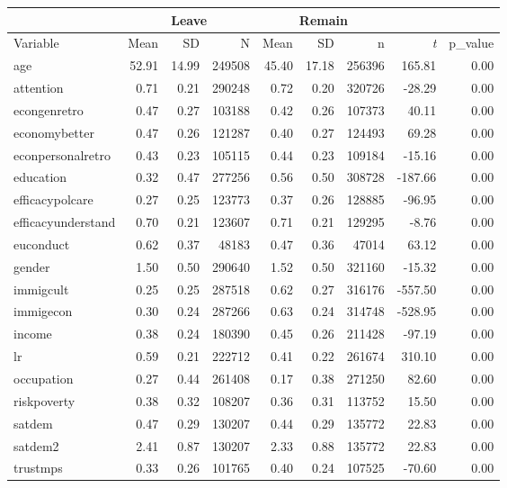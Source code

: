 \documentclass{article}
\begin{document}
 \begin{table}[ht]
\centering
\begin{tabular}{lrrrrrrrr}
& \multicolumn{3}{c}{Leave} & \multicolumn{3}{c}{Remain} & \\
  \hline
Variable & Mean & SD & N & Mean & SD & n & \textit{t} & p\_value \\ 
  \hline
age & 52.91 & 14.99 & 249508 & 45.40 & 17.18 & 256396 & 165.81 & 0.00 \\ 
  attention & 0.71 & 0.21 & 290248 & 0.72 & 0.20 & 320726 & -28.29 & 0.00 \\ 
  econgenretro & 0.47 & 0.27 & 103188 & 0.42 & 0.26 & 107373 & 40.11 & 0.00 \\ 
  economybetter & 0.47 & 0.26 & 121287 & 0.40 & 0.27 & 124493 & 69.28 & 0.00 \\ 
  econpersonalretro & 0.43 & 0.23 & 105115 & 0.44 & 0.23 & 109184 & -15.16 & 0.00 \\ 
  education & 0.32 & 0.47 & 277256 & 0.56 & 0.50 & 308728 & -187.66 & 0.00 \\ 
  efficacypolcare & 0.27 & 0.25 & 123773 & 0.37 & 0.26 & 128885 & -96.95 & 0.00 \\ 
  efficacyunderstand & 0.70 & 0.21 & 123607 & 0.71 & 0.21 & 129295 & -8.76 & 0.00 \\ 
  euconduct & 0.62 & 0.37 & 48183 & 0.47 & 0.36 & 47014 & 63.12 & 0.00 \\ 
  gender & 1.50 & 0.50 & 290640 & 1.52 & 0.50 & 321160 & -15.32 & 0.00 \\ 
  immigcult & 0.25 & 0.25 & 287518 & 0.62 & 0.27 & 316176 & -557.50 & 0.00 \\ 
  immigecon & 0.30 & 0.24 & 287266 & 0.63 & 0.24 & 314748 & -528.95 & 0.00 \\ 
  income & 0.38 & 0.24 & 180390 & 0.45 & 0.26 & 211428 & -97.19 & 0.00 \\ 
  lr & 0.59 & 0.21 & 222712 & 0.41 & 0.22 & 261674 & 310.10 & 0.00 \\ 
  occupation & 0.27 & 0.44 & 261408 & 0.17 & 0.38 & 271250 & 82.60 & 0.00 \\ 
  riskpoverty & 0.38 & 0.32 & 108207 & 0.36 & 0.31 & 113752 & 15.50 & 0.00 \\ 
  satdem & 0.47 & 0.29 & 130207 & 0.44 & 0.29 & 135772 & 22.83 & 0.00 \\ 
  satdem2 & 2.41 & 0.87 & 130207 & 2.33 & 0.88 & 135772 & 22.83 & 0.00 \\ 
  trustmps & 0.33 & 0.26 & 101765 & 0.40 & 0.24 & 107525 & -70.60 & 0.00 \\ 
   \hline
\end{tabular}
\end{table}
\end{document}
